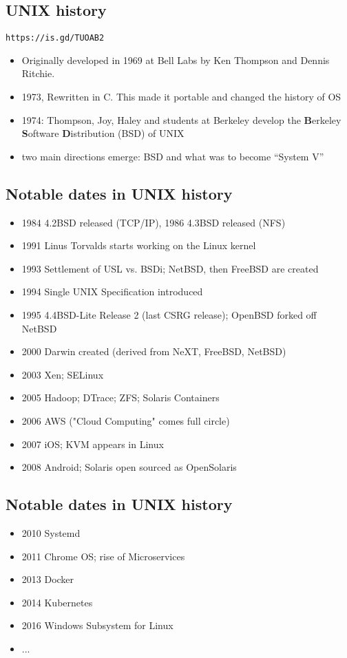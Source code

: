\documentclass[xga]{xdvislides}
\begin{document}
\subsection{UNIX history}
\verb+https://is.gd/TUOAB2+

\begin{itemize}
	\item Originally developed in 1969 at Bell Labs by Ken Thompson
		and Dennis Ritchie.
	\item 1973, Rewritten in C. This made it portable and changed the history of OS
	\item 1974: Thompson, Joy, Haley and students at Berkeley develop
		the {\bf B}erkeley {\bf S}oftware {\bf D}istribution (BSD) of UNIX
	\item two main directions emerge: BSD and what was to become ``System V''
\end{itemize}

\subsection{Notable dates in UNIX history}
\begin{itemize}
	\item 1984 4.2BSD released (TCP/IP), 1986 4.3BSD released (NFS)
	\item 1991 Linus Torvalds starts working on the Linux kernel
	\item 1993 Settlement of USL vs. BSDi; NetBSD, then FreeBSD are created
	\item 1994 Single UNIX Specification introduced
	\item 1995 4.4BSD-Lite Release 2 (last CSRG release); OpenBSD
		forked off NetBSD
	\item 2000 Darwin created (derived from NeXT, FreeBSD, NetBSD)
	\item 2003 Xen; SELinux
	\item 2005 Hadoop; DTrace; ZFS; Solaris Containers
	\item 2006 AWS ("Cloud Computing" comes full circle)
	\item 2007 iOS; KVM appears in Linux
	\item 2008 Android; Solaris open sourced as OpenSolaris
\end{itemize}

\subsection{Notable dates in UNIX history}
\begin{itemize}
	\item 2010 Systemd
	\item 2011 Chrome OS; rise of Microservices
	\item 2013 Docker
	\item 2014 Kubernetes
	\item 2016 Windows Subsystem for Linux
	\item ...
\end{itemize}
\end{document}
